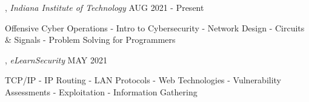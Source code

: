 
, \textit{Indiana Institute of Technology}	\hfill AUG 2021 - Present 
\begin{zitemize}
\item Offensive Cyber Operations - Intro to Cybersecurity - Network Design - Circuits \& Signals - Problem Solving for Programmers
\end{zitemize}
, \textit{eLearnSecurity} \hfill	MAY 2021
\begin{zitemize}
\item TCP/IP - IP Routing - LAN Protocols - Web Technologies - Vulnerability Assessments - Exploitation - Information Gathering
\end{zitemize}


